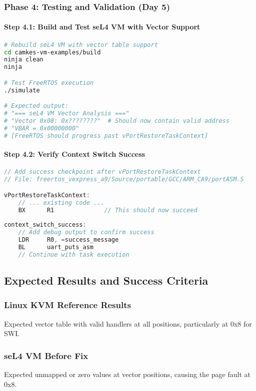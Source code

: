 \documentclass[11pt,a4paper]{article}
\begin{document}
\subsubsection{Phase 4: Testing and Validation (Day 5)}

\paragraph{Step 4.1: Build and Test seL4 VM with Vector Support}
\begin{lstlisting}[language=bash]
# Rebuild seL4 VM with vector table support
cd camkes-vm-examples/build
ninja clean
ninja

# Test FreeRTOS execution
./simulate

# Expected output:
# "=== seL4 VM Vector Analysis ==="
# "Vector 0x08: 0x????????"  # Should now contain valid address
# "VBAR = 0x00000000"
# [FreeRTOS should progress past vPortRestoreTaskContext]
\end{lstlisting}

\paragraph{Step 4.2: Verify Context Switch Success}
\begin{lstlisting}[language=c]
// Add success checkpoint after vPortRestoreTaskContext
// File: freertos_vexpress_a9/Source/portable/GCC/ARM_CA9/portASM.S

vPortRestoreTaskContext:
    // ... existing code ...
    BX      R1              // This should now succeed
    
context_switch_success:
    // Add debug output to confirm success
    LDR     R0, =success_message
    BL      uart_puts_asm
    // Continue with task execution
\end{lstlisting}

\subsection{Expected Results and Success Criteria}

\subsubsection{Linux KVM Reference Results}
Expected vector table with valid handlers at all positions, particularly at 0x8 for SWI.

\subsubsection{seL4 VM Before Fix}
Expected unmapped or zero values at vector positions, causing the page fault at 0x8.
\end{document}
